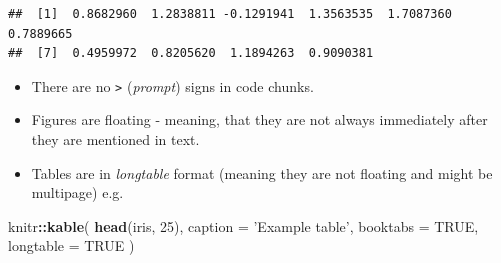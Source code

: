 \documentclass[]{book}
\newenvironment{Shaded}{\begin{snugshade}}{\end{snugshade}}
\newcommand{\KeywordTok}[1]{\textcolor[rgb]{0.13,0.29,0.53}{\textbf{#1}}}
\newcommand{\DataTypeTok}[1]{\textcolor[rgb]{0.13,0.29,0.53}{#1}}
\newcommand{\DecValTok}[1]{\textcolor[rgb]{0.00,0.00,0.81}{#1}}
\newcommand{\StringTok}[1]{\textcolor[rgb]{0.31,0.60,0.02}{#1}}
\newcommand{\OtherTok}[1]{\textcolor[rgb]{0.56,0.35,0.01}{#1}}
\newcommand{\OperatorTok}[1]{\textcolor[rgb]{0.81,0.36,0.00}{\textbf{#1}}}
\newcommand{\NormalTok}[1]{#1}
\providecommand{\tightlist}{%
  \setlength{\itemsep}{0pt}\setlength{\parskip}{0pt}}
\theoremstyle{definition}
\theoremstyle{definition}
\theoremstyle{definition}
\theoremstyle{remark}
\begin{document}
\begin{verbatim}
##  [1]  0.8682960  1.2838811 -0.1291941  1.3563535  1.7087360  0.7889665
##  [7]  0.4959972  0.8205620  1.1894263  0.9090381
\end{verbatim}

\begin{itemize}
\tightlist
\item
  There are no \texttt{\textgreater{}} (\emph{prompt}) signs in code
  chunks.
\item
  Figures are floating - meaning, that they are not always immediately
  after they are mentioned in text.
\item
  Tables are in \emph{longtable} format (meaning they are not floating
  and might be multipage) e.g.
\end{itemize}

\begin{Shaded}
\begin{Highlighting}[]
\NormalTok{knitr}\OperatorTok{::}\KeywordTok{kable}\NormalTok{(}
  \KeywordTok{head}\NormalTok{(iris, }\DecValTok{25}\NormalTok{), }\DataTypeTok{caption =} \StringTok{'Example table'}\NormalTok{,}
  \DataTypeTok{booktabs =} \OtherTok{TRUE}\NormalTok{, }\DataTypeTok{longtable =} \OtherTok{TRUE}
\NormalTok{)}
\end{Highlighting}
\end{Shaded}
\end{document}

